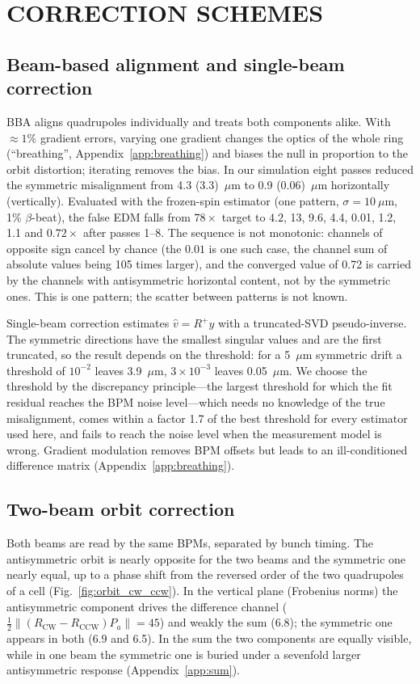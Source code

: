 \documentclass[aps,prab,reprint,superscriptaddress,nofootinbib]{revtex4-2}
\begin{document}
\section{CORRECTION SCHEMES}
\label{sec:schemes}
\subsection{Beam-based alignment and single-beam correction}
BBA aligns quadrupoles individually and treats both components alike. With $\approx1\%$ gradient errors,
varying one gradient changes the optics of the whole ring (``breathing'', Appendix~\ref{app:breathing}) and
biases the null in proportion to the orbit distortion; iterating removes the bias. In our simulation eight
passes reduced the symmetric misalignment from 4.3 (3.3)~$\mu$m to 0.9 (0.06)~$\mu$m horizontally (vertically).
Evaluated with the frozen-spin estimator (one pattern, $\sigma=10~\mu$m, 1\% $\beta$-beat), the false EDM falls
from $78\times$ target to $4.2$, 13, 9.6, 4.4, 0.01, 1.2, 1.1 and $0.72\times$ after passes 1--8. The sequence is
not monotonic: channels of opposite sign cancel by chance (the $0.01$ is one such case, the channel sum of
absolute values being 105 times larger), and the converged value of 0.72 is carried by the channels with
antisymmetric horizontal content, not by the symmetric ones. This is one pattern; the scatter between patterns is
not known.

Single-beam correction estimates $\hat v=R^{+}y$ with a truncated-SVD pseudo-inverse. The symmetric directions
have the smallest singular values and are the first truncated, so the result depends on the threshold: for a
5~$\mu$m symmetric drift a threshold of $10^{-2}$ leaves 3.9~$\mu$m, $3\times10^{-3}$ leaves 0.05~$\mu$m. We
choose the threshold by the discrepancy principle---the largest threshold for which the fit residual reaches
the BPM noise level---which needs no knowledge of the true misalignment, comes within a factor 1.7 of the best
threshold for every estimator used here, and fails to reach the noise level when the measurement model is
wrong. Gradient modulation removes BPM offsets but leads to an ill-conditioned difference matrix
(Appendix~\ref{app:breathing}).

\subsection{Two-beam orbit correction}
\label{sec:croc}
Both beams are read by the same BPMs, separated by bunch timing. The antisymmetric orbit is nearly opposite
for the two beams and the symmetric one nearly equal, up to a phase shift from the reversed order of the two
quadrupoles of a cell (Fig.~\ref{fig:orbit_cw_ccw}). In the vertical plane (Frobenius norms) the antisymmetric
component drives the difference channel ($\tfrac12\|(R_\text{CW}-R_\text{CCW})P_a\|=45$) and weakly the sum
(6.8); the symmetric one appears in both (6.9 and 6.5). In the sum the two components are equally visible,
while in one beam the symmetric one is buried under a sevenfold larger antisymmetric response
(Appendix~\ref{app:sum}).
\end{document}
